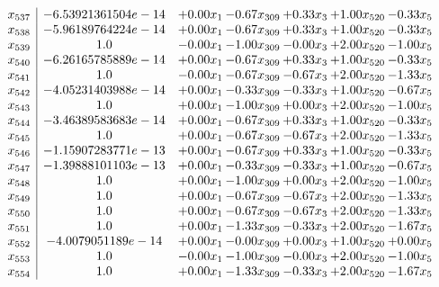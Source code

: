 \documentclass[8pt]{article}
\begin{document}
\[\begin{array}{c| c c@{\hskip 2pt} c@{\hskip 2pt} c@{\hskip 2pt} c@{\hskip 2pt} c@{\hskip 2pt} }
 x_{537}   &  -6.53921361504e-14 & +  0.00 x_{1} & -0.67 x_{309} & +  0.33 x_{3} & +  1.00 x_{520} & -0.33 x_{5}\\
 x_{538}   &  -5.96189764224e-14 & +  0.00 x_{1} & -0.67 x_{309} & +  0.33 x_{3} & +  1.00 x_{520} & -0.33 x_{5}\\
 x_{539}   &  1.0 & -0.00 x_{1} & -1.00 x_{309} & -0.00 x_{3} & +  2.00 x_{520} & -1.00 x_{5}\\
 x_{540}   &  -6.26165785889e-14 & +  0.00 x_{1} & -0.67 x_{309} & +  0.33 x_{3} & +  1.00 x_{520} & -0.33 x_{5}\\
 x_{541}   &  1.0 & -0.00 x_{1} & -0.67 x_{309} & -0.67 x_{3} & +  2.00 x_{520} & -1.33 x_{5}\\
 x_{542}   &  -4.05231403988e-14 & +  0.00 x_{1} & -0.33 x_{309} & -0.33 x_{3} & +  1.00 x_{520} & -0.67 x_{5}\\
 x_{543}   &  1.0 & +  0.00 x_{1} & -1.00 x_{309} & +  0.00 x_{3} & +  2.00 x_{520} & -1.00 x_{5}\\
 x_{544}   &  -3.46389583683e-14 & +  0.00 x_{1} & -0.67 x_{309} & +  0.33 x_{3} & +  1.00 x_{520} & -0.33 x_{5}\\
 x_{545}   &  1.0 & +  0.00 x_{1} & -0.67 x_{309} & -0.67 x_{3} & +  2.00 x_{520} & -1.33 x_{5}\\
 x_{546}   &  -1.15907283771e-13 & +  0.00 x_{1} & -0.67 x_{309} & +  0.33 x_{3} & +  1.00 x_{520} & -0.33 x_{5}\\
 x_{547}   &  -1.39888101103e-13 & +  0.00 x_{1} & -0.33 x_{309} & -0.33 x_{3} & +  1.00 x_{520} & -0.67 x_{5}\\
 x_{548}   &  1.0 & +  0.00 x_{1} & -1.00 x_{309} & +  0.00 x_{3} & +  2.00 x_{520} & -1.00 x_{5}\\
 x_{549}   &  1.0 & +  0.00 x_{1} & -0.67 x_{309} & -0.67 x_{3} & +  2.00 x_{520} & -1.33 x_{5}\\
 x_{550}   &  1.0 & +  0.00 x_{1} & -0.67 x_{309} & -0.67 x_{3} & +  2.00 x_{520} & -1.33 x_{5}\\
 x_{551}   &  1.0 & +  0.00 x_{1} & -1.33 x_{309} & -0.33 x_{3} & +  2.00 x_{520} & -1.67 x_{5}\\
 x_{552}   &  -4.0079051189e-14 & +  0.00 x_{1} & -0.00 x_{309} & +  0.00 x_{3} & +  1.00 x_{520} & +  0.00 x_{5}\\
 x_{553}   &  1.0 & -0.00 x_{1} & -1.00 x_{309} & -0.00 x_{3} & +  2.00 x_{520} & -1.00 x_{5}\\
 x_{554}   &  1.0 & +  0.00 x_{1} & -1.33 x_{309} & -0.33 x_{3} & +  2.00 x_{520} & -1.67 x_{5}\\

\end{array}\]
\end{document}
